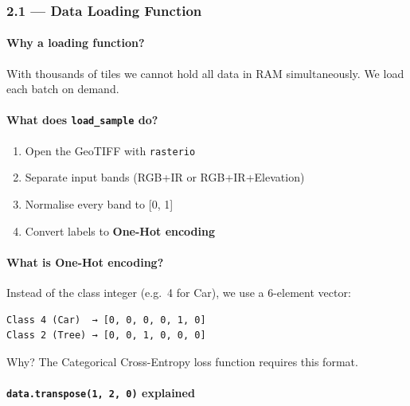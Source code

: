 \documentclass[11pt]{article}
\providecommand{\tightlist}{%
      \setlength{\itemsep}{0pt}\setlength{\parskip}{0pt}}
\begin{document}
    \subsubsection{2.1 --- Data Loading
Function}\label{data-loading-function}

\paragraph{Why a loading function?}\label{why-a-loading-function}

With thousands of tiles we cannot hold all data in RAM simultaneously.
We load each batch on demand.

\paragraph{\texorpdfstring{What does \texttt{load\_sample}
do?}{What does load\_sample do?}}\label{what-does-load_sample-do}

\begin{enumerate}
\def\labelenumi{\arabic{enumi}.}
\tightlist
\item
  Open the GeoTIFF with \texttt{rasterio}
\item
  Separate input bands (RGB+IR or RGB+IR+Elevation)
\item
  Normalise every band to {[}0, 1{]}
\item
  Convert labels to \textbf{One-Hot encoding}
\end{enumerate}

\paragraph{What is One-Hot encoding?}\label{what-is-one-hot-encoding}

Instead of the class integer (e.g.~4 for Car), we use a 6-element
vector:

\begin{verbatim}
Class 4 (Car)  → [0, 0, 0, 0, 1, 0]
Class 2 (Tree) → [0, 0, 1, 0, 0, 0]
\end{verbatim}

Why? The Categorical Cross-Entropy loss function requires this format.

\paragraph{\texorpdfstring{\texttt{data.transpose(1,\ 2,\ 0)}
explained}{data.transpose(1, 2, 0) explained}}\label{data.transpose1-2-0-explained}
\end{document}
